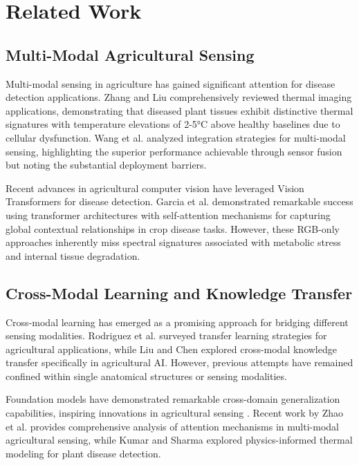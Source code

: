 \documentclass[conference]{IEEEtran}
\begin{document}
\section{Related Work}

\subsection{Multi-Modal Agricultural Sensing}

Multi-modal sensing in agriculture has gained significant attention for disease detection applications. Zhang and Liu \cite{zhang2022thermal} comprehensively reviewed thermal imaging applications, demonstrating that diseased plant tissues exhibit distinctive thermal signatures with temperature elevations of 2-5°C above healthy baselines due to cellular dysfunction. Wang et al. \cite{wang2023multimodal} analyzed integration strategies for multi-modal sensing, highlighting the superior performance achievable through sensor fusion but noting the substantial deployment barriers.

Recent advances in agricultural computer vision have leveraged Vision Transformers for disease detection. Garcia et al. \cite{garcia2022vision} demonstrated remarkable success using transformer architectures with self-attention mechanisms for capturing global contextual relationships in crop disease tasks. However, these RGB-only approaches inherently miss spectral signatures associated with metabolic stress and internal tissue degradation.

\subsection{Cross-Modal Learning and Knowledge Transfer}

Cross-modal learning has emerged as a promising approach for bridging different sensing modalities. Rodriguez et al. \cite{rodriguez2023transfer} surveyed transfer learning strategies for agricultural applications, while Liu and Chen \cite{liu2022crossmodal} explored cross-modal knowledge transfer specifically in agricultural AI. However, previous attempts have remained confined within single anatomical structures or sensing modalities.

Foundation models have demonstrated remarkable cross-domain generalization capabilities, inspiring innovations in agricultural sensing \cite{dosovitskiy2021attention}. Recent work by Zhao et al. \cite{zhao2023attention} provides comprehensive analysis of attention mechanisms in multi-modal agricultural sensing, while Kumar and Sharma \cite{kumar2023thermal} explored physics-informed thermal modeling for plant disease detection.
\end{document}
